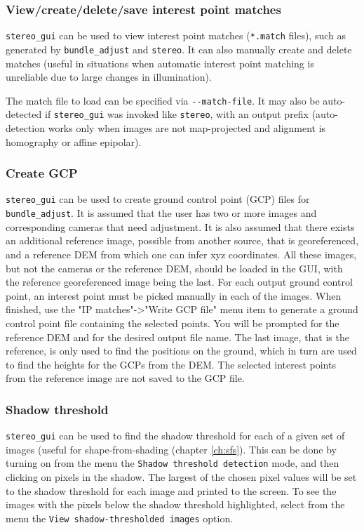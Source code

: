 \subsubsection{View/create/delete/save interest point matches}

\texttt{stereo\_gui} can be used to view interest point matches
(\texttt{*.match} files), such as generated by \texttt{bundle\_adjust}
and \texttt{stereo}. It can also manually create and delete
matches (useful in situations when automatic interest point matching is
unreliable due to large changes in illumination).

The match file to load can be specified via \texttt{-\/-match-file}.  It
may also be auto-detected if \texttt{stereo\_gui} was invoked like
\texttt{stereo}, with an output prefix (auto-detection works only when
images are not map-projected and alignment is homography or affine
epipolar).

\subsubsection{Create GCP}
\label{bagcp}

\texttt{stereo\_gui} can be used to create
ground control point (GCP) files for \texttt{bundle\_adjust}. It is
assumed that the user has two or more images and corresponding cameras
that need adjustment. It is also assumed that there exists an additional
reference image, possible from another source, that is georeferenced,
and a reference DEM from which one can infer xyz coordinates. All these
images, but not the cameras or the reference DEM, should be loaded in the
GUI, with the reference georeferenced image being the last. For each
output ground control point, an interest point must be picked manually
in each of the images. When finished, use the "IP matches"->"Write GCP
file" menu item to generate a ground control point file containing the
selected points.  You will be prompted for the reference DEM and for the
desired output file name. The last image, that is the reference, is only
used to find the positions on the ground, which in turn are used to find
the heights for the GCPs from the DEM. The selected interest points from
the reference image are not saved to the GCP file.

\subsubsection{Shadow threshold}
\texttt{stereo\_gui} can be used to find the shadow threshold for each
of a given set of images (useful for shape-from-shading (chapter \ref{ch:sfs}).
This can be done by turning on from the menu
the \texttt{Shadow threshold detection} mode, and then clicking on
pixels in the shadow. The largest of the chosen pixel values will be set
to the shadow threshold for each image and printed to the screen. To see
the images with the pixels below the shadow threshold highlighted,
select from the menu the \texttt{View shadow-thresholded images} option.

